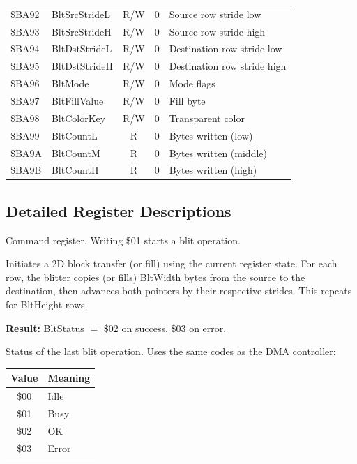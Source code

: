 \begin{center}
\begin{longtable}{@{}llcll@{}}
\$BA92 & BltSrcStrideL & R/W & 0   & Source row stride low \\
\$BA93 & BltSrcStrideH & R/W & 0   & Source row stride high \\
\$BA94 & BltDstStrideL & R/W & 0   & Destination row stride low \\
\$BA95 & BltDstStrideH & R/W & 0   & Destination row stride high \\
\$BA96 & BltMode      & R/W & 0    & Mode flags \\
\$BA97 & BltFillValue & R/W & 0    & Fill byte \\
\$BA98 & BltColorKey  & R/W & 0    & Transparent color \\
\$BA99 & BltCountL    & R   & 0    & Bytes written (low) \\
\$BA9A & BltCountM    & R   & 0    & Bytes written (middle) \\
\$BA9B & BltCountH    & R   & 0    & Bytes written (high) \\
\bottomrule
\end{longtable}
\end{center}

\subsection{Detailed Register Descriptions}



Command register.  Writing \$01 starts a blit operation.


Initiates a 2D block transfer (or fill) using the current register state.
For each row, the blitter copies (or fills) BltWidth bytes from the source
to the destination, then advances both pointers by their respective strides.
This repeats for BltHeight rows.

\textbf{Result:} BltStatus $=$ \$02 on success, \$03 on error.



Status of the last blit operation.  Uses the same codes as the DMA
controller:

\begin{center}
\small
\begin{tabular}{@{}cl@{}}
\toprule
\textbf{Value} & \textbf{Meaning} \\
\midrule
\$00 & Idle \\
\$01 & Busy \\
\$02 & OK \\
\$03 & Error \\
\bottomrule
\end{tabular}
\end{center}

